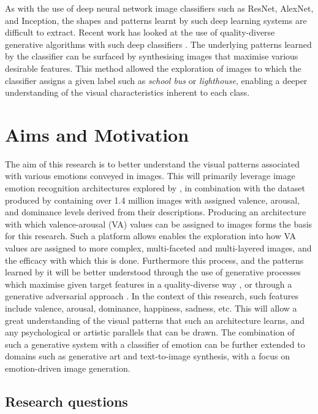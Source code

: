 \documentclass{article}
\begin{document}
As with the use of deep neural network image classifiers such as ResNet, AlexNet, and Inception, the shapes and patterns learnt by such deep learning systems are difficult to extract.
Recent work has looked at the use of quality-diverse generative algorithms with such deep classifiers \citep{nguyen2015deep, nguyen2015innovation}.
The underlying patterns learned by the classifier can be surfaced by synthesising images that maximise various desirable features.
This method allowed the exploration of images to which the classifier assigns a given label such as \textit{school bus} or \textit{lighthouse}, enabling a deeper understanding of the visual characteristics inherent to each class.

\section{Aims and Motivation}
The aim of this research is to better understand the visual patterns associated with various emotions conveyed in images.
This will primarily leverage image emotion recognition architectures explored by \citet{kim2018building}, in combination with the dataset produced by \citet{zhao2016predicting} containing over 1.4 million images with assigned valence, arousal, and dominance levels derived from their descriptions.
Producing an architecture with which valence-arousal (VA) values can be assigned to images forms the basis for this research.
Such a platform allows enables the exploration into how VA values are assigned to more complex, multi-faceted and multi-layered images, and the efficacy with which this is done.
Furthermore this process, and the patterns learned by it will be better understood through the use of generative processes which maximise given target features in a quality-diverse way \citep{nguyen2015innovation, nguyen2015deep}, or through a generative adversarial approach \citep{tan2017artgan}.
In the context of this research, such features include valence, arousal, dominance, happiness, sadness, etc.
This will allow a great understanding of the visual patterns that such an architecture learns, and any psychological or artistic parallels that can be drawn.
The combination of such a generative system with a classifier of emotion can be further extended to domains such as generative art and text-to-image synthesis, with a focus on emotion-driven image generation.

\subsection{Research questions}
\end{document}
